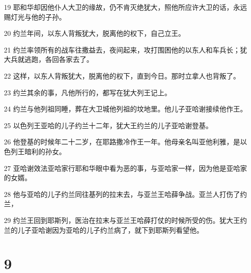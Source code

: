 \par 19 耶和华却因他仆人大卫的缘故，仍不肯灭绝犹大，照他所应许大卫的话，永远赐灯光与他的子孙。
\par 20 约兰年间，以东人背叛犹大，脱离他的权下，自己立王。
\par 21 约兰率领所有的战车往撒益去，夜间起来，攻打围困他的以东人和车兵长；犹大兵就逃跑，各回各家去了。
\par 22 这样，以东人背叛犹大，脱离他的权下，直到今日。那时立拿人也背叛了。
\par 23 约兰其余的事，凡他所行的，都写在犹大列王记上。
\par 24 约兰与他列祖同睡，葬在大卫城他列祖的坟地里。他儿子亚哈谢接续他作王。
\par 25 以色列王亚哈的儿子约兰十二年，犹大王约兰的儿子亚哈谢登基。
\par 26 他登基的时候年二十二岁，在耶路撒冷作王一年。他母亲名叫亚他利雅，是以色列王暗利的孙女。
\par 27 亚哈谢效法亚哈家行耶和华眼中看为恶的事，与亚哈家一样，因为他是亚哈家的女婿。
\par 28 他与亚哈的儿子约兰同往基列的拉末去，与亚兰王哈薛争战。亚兰人打伤了约兰，
\par 29 约兰王回到耶斯列，医治在拉末与亚兰王哈薛打仗的时候所受的伤。犹大王约兰的儿子亚哈谢因为亚哈的儿子约兰病了，就下到耶斯列看望他。

\chapter{9}

